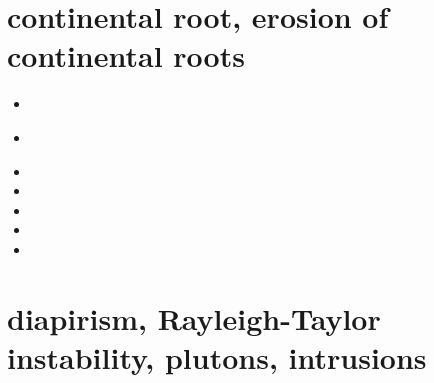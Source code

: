 \section{continental root, erosion of continental roots}

\begin{small}
\begin{itemize}
\item[1999] 
\item[2000] 
 \\
\item[2003] 
\item[2006] 
\item[2010] 
\item[2021] 
\item[2025] 
\end{itemize}
\end{small}






\section{diapirism, Rayleigh-Taylor instability, plutons, intrusions}

